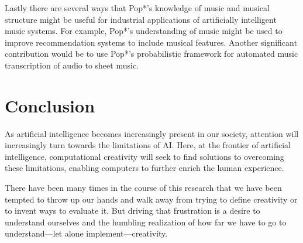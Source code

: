 \documentclass[phd,electronic,oneside,twosidetoc,letterpaper,chaptercenter,parttop,lof,lot]{byumsphd}
\begin{document}
Lastly there are several ways that Pop*'s knowledge of music and musical structure might be useful for industrial applications of artificially intelligent music systems. For example, Pop*'s understanding of music might be used to improve recommendation systems to include musical features. Another significant contribution would be to use Pop*'s probabilistic framework for automated music transcription of audio to sheet music.

\section{Conclusion}

As artificial intelligence becomes increasingly present in our society, attention will increasingly turn towards the limitations of AI. Here, at the frontier of artificial intelligence, computational creativity will seek to find solutions to overcoming these limitations, enabling computers to further enrich the human experience.

There have been many times in the course of this research that we have been tempted to throw up our hands and walk away from trying to define creativity or to invent ways to evaluate it. But driving that frustration is a desire to understand ourselves and the humbling realization of how far we have to go to understand---let alone implement---creativity.



\end{document}
